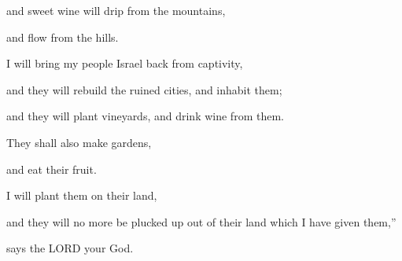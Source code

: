 	and sweet wine will drip from the mountains,
	
	and flow from the hills.
	
	\myverse{}I will bring my people Israel back from captivity,
	
	and they will rebuild the ruined cities, and inhabit them;
	
	and they will plant vineyards, and drink wine from them.
	
	They shall also make gardens,
	
	and eat their fruit.
	
	\myverse{}I will plant them on their land,
	
	and they will no more be plucked up out of their land which I have given them,”
	
	says the LORD your God.


